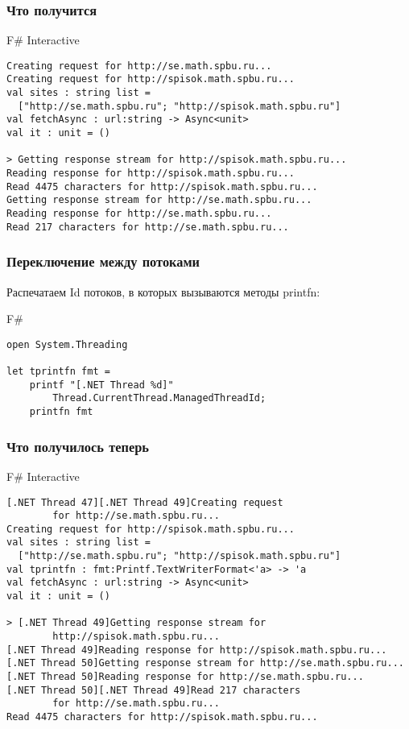 \documentclass[xetex,mathserif,serif]{beamer}
\begin{document}
	\begin{frame}[fragile]
		\frametitle{Что получится}
		\begin{alertblock}{F\# Interactive}
			\begin{verbatim}
Creating request for http://se.math.spbu.ru...
Creating request for http://spisok.math.spbu.ru...
val sites : string list =
  ["http://se.math.spbu.ru"; "http://spisok.math.spbu.ru"]
val fetchAsync : url:string -> Async<unit>
val it : unit = ()

> Getting response stream for http://spisok.math.spbu.ru...
Reading response for http://spisok.math.spbu.ru...
Read 4475 characters for http://spisok.math.spbu.ru...
Getting response stream for http://se.math.spbu.ru...
Reading response for http://se.math.spbu.ru...
Read 217 characters for http://se.math.spbu.ru...
			\end{verbatim}
		\end{alertblock}
\end{frame}

	\begin{frame}[fragile]
		\frametitle{Переключение между потоками}
		Распечатаем Id потоков, в которых вызываются методы printfn:
		\begin{exampleblock}{F\#}
			\begin{verbatim}
open System.Threading

let tprintfn fmt =
    printf "[.NET Thread %d]"   
        Thread.CurrentThread.ManagedThreadId;
    printfn fmt
			\end{verbatim}
		\end{exampleblock}
\end{frame}

	\begin{frame}[fragile]
		\frametitle{Что получилось теперь}
		\begin{footnotesize}
			\begin{alertblock}{F\# Interactive}
				\begin{verbatim}
[.NET Thread 47][.NET Thread 49]Creating request 
        for http://se.math.spbu.ru...
Creating request for http://spisok.math.spbu.ru...
val sites : string list =
  ["http://se.math.spbu.ru"; "http://spisok.math.spbu.ru"]
val tprintfn : fmt:Printf.TextWriterFormat<'a> -> 'a
val fetchAsync : url:string -> Async<unit>
val it : unit = ()

> [.NET Thread 49]Getting response stream for 
        http://spisok.math.spbu.ru...
[.NET Thread 49]Reading response for http://spisok.math.spbu.ru...
[.NET Thread 50]Getting response stream for http://se.math.spbu.ru...
[.NET Thread 50]Reading response for http://se.math.spbu.ru...
[.NET Thread 50][.NET Thread 49]Read 217 characters 
        for http://se.math.spbu.ru...
Read 4475 characters for http://spisok.math.spbu.ru...
				\end{verbatim}
			\end{alertblock}
		\end{footnotesize}
\end{frame}
\end{document}
